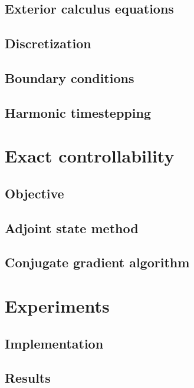 \documentclass[utf8,english]{gradu3}
\begin{document}
\section{Exterior calculus equations}

\section{Discretization}

\section{Boundary conditions}\label{sec:boundary_conditions}

\section{Harmonic timestepping}\label{sec:harmonic_timestep}



\chapter{Exact controllability}


\section{Objective}

\section{Adjoint state method}

\section{Conjugate gradient algorithm}



\chapter{Experiments}

\section{Implementation}

\section{Results}
\end{document}
